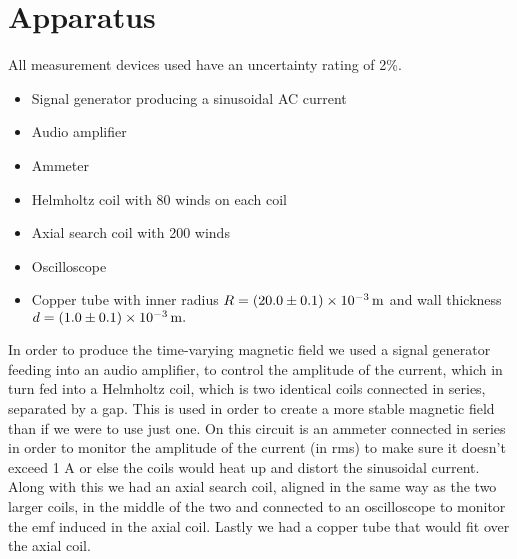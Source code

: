 \documentclass[12pt]{article}
\numberwithin{equation}{section}
\numberwithin{figure}{section}
\begin{document}
    \section{Apparatus}\label{sec:Apparatus}
    All measurement devices used have an uncertainty rating of 2\%.
    \begin{itemize}
        \item Signal generator producing a sinusoidal AC current
        \item Audio amplifier
        \item Ammeter
        \item Helmholtz coil with 80 winds on each coil
        \item Axial search coil with 200 winds
        \item Oscilloscope 
        \item Copper tube with inner radius $R=\SI{20\pm0.1e-3}{\metre}$ and wall thickness 
        $d=\SI{1\pm0.1e-3}{\metre}.$
    \end{itemize}
    In order to produce the time-varying magnetic field we used a signal generator feeding into 
    an audio amplifier, to control the amplitude of the current, which in turn fed into a 
    Helmholtz coil, which is two identical coils connected in series, separated by a gap. This 
    is used in order to create a more stable magnetic field than if we were to use just one. 
    On this circuit is an ammeter connected in series in order to monitor the amplitude of the 
    current (in rms) to make sure it doesn't exceed 1 A or else the coils would heat up and 
    distort the sinusoidal current. \newline
    Along with this we had an axial search coil, aligned in the same way as the two larger coils, 
    in the middle of the two and connected to an oscilloscope to monitor the emf induced in the 
    axial coil. Lastly we had a copper tube that would fit over the axial coil.
\end{document}
